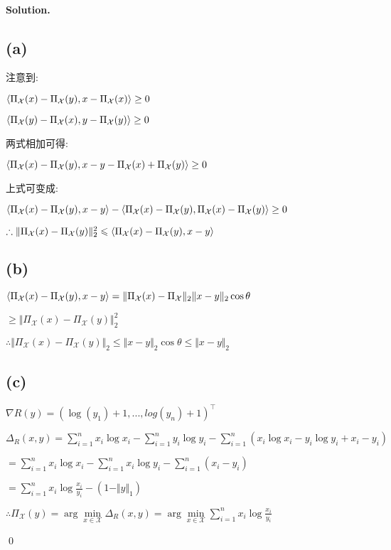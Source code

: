 \documentclass[a4paper]{article}
\newenvironment{solution}
{\color{blue} \paragraph{Solution.}}
{\newline \qed}
\begin{document}
\begin{solution}
\subsection*{(a)}
注意到:

$\braket{\Pi_{\mathcal{X}}(x)-\Pi_{\mathcal{X}}(y), x-\Pi_{\mathcal{X}}(x)} \geq 0$

$\braket{\Pi_{\mathcal{X}}(y)-\Pi_{\mathcal{X}}(x), y-\Pi_{\mathcal{X}}(y)} \geq 0 $

两式相加可得:

$\braket{\Pi_{\mathcal{X}}(x)-\Pi_{\mathcal{X}}(y), x-y-\Pi_{\mathcal{X}}(x)+\Pi_{\mathcal{X}}(y)}\geq 0$

上式可变成:

$\braket{\Pi_{\mathcal{X}}(x)-\Pi_{\mathcal{X}}(y), x-y}-\braket{\Pi_{\mathcal{X}}(x)-\Pi_{\mathcal{X}}(y), \Pi_{\mathcal{X}}(x)-\Pi_{\mathcal{X}}(y)}\geq 0$

$\therefore \Vert \Pi_{\mathcal{X}} (x) - \Pi_{\mathcal{X}} (y) \Vert^2_2 \leqslant \Braket{\Pi_{\mathcal{X}} (x) - \Pi_{\mathcal{X}} (y), x - y}$
\subsection*{(b)}
$\Braket{\Pi_{\mathcal{X}} (x)-\Pi_{\mathcal{X}} (y), x-y} 
= \Vert \Pi_{\mathcal{X}} (x)-\Pi_{\mathcal{X}} \Vert_2 \Vert x-y \Vert_2 \cos \theta$

$\geq \Vert \Pi_{\mathcal{X}} (x) - \Pi_{\mathcal{X}} (y) \Vert^2_2$

$\therefore \Vert \Pi_{\mathcal{X}} (x) - \Pi_{\mathcal{X}} (y) \Vert_2 \leqslant \Vert x - y \Vert_2 \cos \theta \leq \Vert x - y \Vert_2$
\subsection*{(c)}
$\nabla R(y)=(\log (y_1)+1, ..., log(y_n)+1)^{\top}$

$\Delta_R(x,y)=\sum^n_{i=1}x_i\log x_i -\sum^n_{i=1}y_i\log y_i- \sum^n
_{i=1}(x_i\log x_i-y_i\log y_i+x_i-y_i)$

$=\sum^n_{i=1}x_i\log x_i -\sum^n_{i=1}x_i\log y_i -\sum^n_{i=1}(x_i-y_i)$

$=\sum^n_{i=1}x_i\log \frac{x_i}{y_i}-(1-\Vert y \Vert_1)$

$\therefore \Pi_{\mathcal{X}}(y)=\arg\min\limits_{x \in \mathcal{X}}\Delta_R(x,y)=\arg\min\limits_{x \in \mathcal{X}} \sum^n_{i=1}x_i\log \frac{x_i}{y_i}$


\end{solution}
\end{document}
